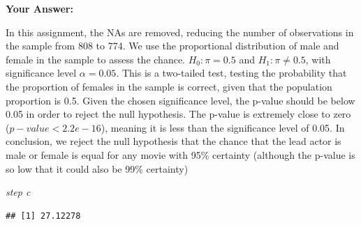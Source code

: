 \documentclass[
]{article}
\newenvironment{Shaded}{\begin{snugshade}}{\end{snugshade}}
\newcommand{\AttributeTok}[1]{\textcolor[rgb]{0.13,0.29,0.53}{#1}}
\newcommand{\CommentTok}[1]{\textcolor[rgb]{0.56,0.35,0.01}{\textit{#1}}}
\newcommand{\ConstantTok}[1]{\textcolor[rgb]{0.56,0.35,0.01}{#1}}
\newcommand{\FunctionTok}[1]{\textcolor[rgb]{0.13,0.29,0.53}{\textbf{#1}}}
\newcommand{\NormalTok}[1]{#1}
\newcommand{\OtherTok}[1]{\textcolor[rgb]{0.56,0.35,0.01}{#1}}
\newcommand{\SpecialCharTok}[1]{\textcolor[rgb]{0.81,0.36,0.00}{\textbf{#1}}}
\newcommand{\StringTok}[1]{\textcolor[rgb]{0.31,0.60,0.02}{#1}}
\begin{document}
\textbf{Your Answer:}

In this assignment, the NAs are removed, reducing the number of
observations in the sample from 808 to 774. We use the proportional
distribution of male and female in the sample to assess the chance.
\(H_0:\pi=0.5\) and \(H_1:\pi\neq0.5\), with significance level
\(\alpha=0.05\). This is a two-tailed test, testing the probability that
the proportion of females in the sample is correct, given that the
population proportion is 0.5. Given the chosen significance level, the
p-value should be below 0.05 in order to reject the null hypothesis. The
p-value is extremely close to zero (\(p-value<2.2e-16\)), meaning it is
less than the significance level of 0.05. In conclusion, we reject the
null hypothesis that the chance that the lead actor is male or female is
equal for any movie with 95\% certainty (although the p-value is so low
that it could also be 99\% certainty)

\emph{step c}

\begin{Shaded}
\end{Shaded}

\begin{verbatim}
## [1] 27.12278
\end{verbatim}

\begin{Shaded}
\end{Shaded}
\end{document}
